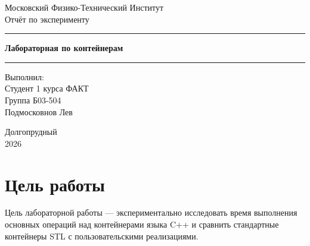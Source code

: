 \documentclass[a4paper,12pt]{article}
\begin{document}
\begin{titlepage}
    \begin{center}

        \vspace*{5cm}

        {\Huge Московский Физико-Технический Институт}\\[2cm]

        {\LARGE Отчёт по эксперименту}\\[0.25cm]

        \noindent\rule{\textwidth}{1pt}
        \vspace*{-0.25cm}

        {\huge \textbf{Лабораторная по контейнерам}}

        \noindent\rule{\textwidth}{1pt}

        \vfill

    \end{center}

    \begin{flushright}
        \begin{minipage}{0.45\textwidth}
            {\Large
                Выполнил:\\
                Студент 1 курса ФАКТ\\
                Группа Б03-504\\
                Подмосковнов Лев
            }
        \end{minipage}
    \end{flushright}

    \vfill

    \begin{center}
        Долгопрудный\\2026
    \end{center}

\end{titlepage}
\restoregeometry

\setcounter{page}{2}

\newpage

\section{Цель работы}

Цель лабораторной работы --- экспериментально исследовать время выполнения основных операций над контейнерами языка C++ и сравнить стандартные контейнеры STL с пользовательскими реализациями.
\end{document}
